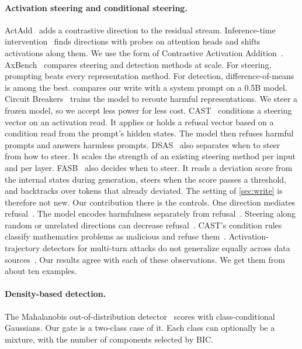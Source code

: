 \documentclass[11pt]{article}
\begin{document}
\paragraph{Activation steering and conditional steering.}
ActAdd~\citep{turner2023actadd} adds a contrastive direction to the residual stream. Inference-time
intervention~\citep{li2023iti} finds directions with probes on attention heads and shifts activations along them. We use the form of
Contrastive Activation Addition~\citep{panickssery2023caa}. AxBench~\citep{wu2025axbench} compares steering
and detection methods at scale. For steering, prompting beats every representation method. For detection,
difference-of-means is among the best.  compares our write with a system prompt on a 0.5B
model. Circuit Breakers~\citep{zou2024circuitbreakers}
trains the model to reroute harmful representations. We steer a frozen model, so we accept less power for
less cost. CAST~\citep{lee2024cast} conditions a steering vector on an activation read. It applies or holds
a refusal vector based on a condition read from the prompt's hidden states. The model then refuses harmful prompts and answers harmless prompts. DSAS~\citep{ferrando2025dsas} also separates when to steer from how
to steer. It scales the strength of an existing steering method per input and per layer. FASB~\citep{fasb2025necessary} also decides when to steer. It reads a deviation score from the internal states during generation, steers when the score passes a threshold, and backtracks over tokens that already deviated. The setting of \cref{sec:write} is therefore not new. Our contribution there is the controls. One direction mediates refusal~\citep{arditi2024refusal}. The model encodes harmfulness
separately from refusal~\citep{zhao2025harmfulness}. Steering along random or unrelated directions can
decrease refusal~\citep{korznikov2025roguescalpel,li2026pitfalls}. CAST's condition rules classify
mathematics problems as malicious and refuse them~\citep{sheng2025alphasteer}. Activation-trajectory
detectors for multi-turn attacks do not generalize equally across data sources~\citep{kulkarni2026lad}.
Our results agree with each of these observations. We get them from about ten examples.

\paragraph{Density-based detection.}
The Mahalanobis out-of-distribution detector~\citep{lee2018mahalanobis} scores with class-conditional
Gaussians. Our gate is a two-class case of it. Each class can optionally be a mixture, with the number of
components selected by BIC.
\end{document}
